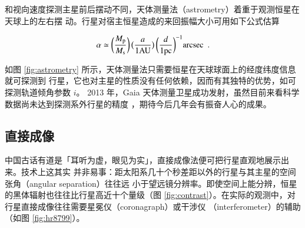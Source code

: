 和视向速度探测主星前后摆动不同，天体测量法（astrometry）着重于观测恒星在天球上的左右摆
动。行星对宿主恒星造成的来回振幅大小可用如下公式估算

\begin{equation}  \label{eq:astrometry} 
\alpha \simeq \bigg(\frac{M_\tif{p}}{M_\tif{s}}\bigg) \, \big(\frac{a}{1 \tif{AU}}\big) \, \bigg(\frac{d}{1 \tif{pc}}\bigg)^{-1} \tif{arcsec} \ \ .
\end{equation} 

如图 \ref{fig:astrometry} 所示，天体测量法只需要恒星在天球球面上的经度纬度信息就可探测到
行星，它也对主星的性质没有任何依赖，因而有其独特的优势，如可探测轨道倾角参数 $i$。
2013 年，Gaia 天体测量卫星成功发射，虽然目前来看科学数据尚未达到探测系外行星的精度
\cite{GaiaCo2016}，期待今后几年会有振奋人心的成果。


\subsection{直接成像}  \label{sec:drctimgmeth}
中国古话有道是「耳听为虚，眼见为实」，直接成像法便可把行星直观地展示出来。技术上这其实
并非易事：距太阳系几十个秒差距以外的行星与其主星的空间张角（angular separation）往往远
小于望远镜分辨率。即使空间上能分辨，恒星的黑体辐射也往往比行星高近十个量级（图 
\ref{fig:contrast}）。在实际的观测中，对行星直接成像往往需要星冕仪（coronagraph）或干涉仪
（interferometer）的辅助（如图 \ref{fig:hr8799}）。

